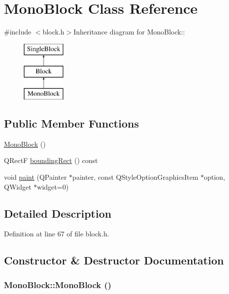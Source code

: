 \hypertarget{class_mono_block}{
\section{MonoBlock Class Reference}
\label{class_mono_block}
}


{\ttfamily \#include $<$block.h$>$}Inheritance diagram for MonoBlock::\begin{figure}[H]
\begin{center}
\leavevmode
\includegraphics[height=3cm]{class_mono_block}
\end{center}
\end{figure}
\subsection*{Public Member Functions}
\begin{DoxyCompactItemize}
\item 
\hyperlink{class_mono_block_a0595d5f49cc46f09803fe4d41eaa9d68}{MonoBlock} ()
\item 
QRectF \hyperlink{class_mono_block_ae85adc70af0318603a03c2daf768c145}{boundingRect} () const 
\item 
void \hyperlink{class_mono_block_a8c2d5b6508508633c4c3234790945c51}{paint} (QPainter $\ast$painter, const QStyleOptionGraphicsItem $\ast$option, QWidget $\ast$widget=0)
\end{DoxyCompactItemize}


\subsection{Detailed Description}


Definition at line 67 of file block.h.

\subsection{Constructor \& Destructor Documentation}
\hypertarget{class_mono_block_a0595d5f49cc46f09803fe4d41eaa9d68}{
\subsubsection[{MonoBlock}]{\setlength{\rightskip}{0pt plus 5cm}MonoBlock::MonoBlock ()}}
\label{class_mono_block_a0595d5f49cc46f09803fe4d41eaa9d68}


